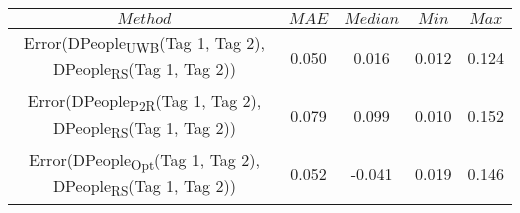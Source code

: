 \begin{table}[h]
\centering
{\small
\begin{tabular}{|c|c|c|c|c|}
\hline
$Method$ & $MAE$ & $Median$ & $Min$ & $Max$ \\
\hline
{\scriptsize Error(DPeople\textsubscript{UWB}(Tag 1, Tag 2), DPeople\textsubscript{RS}(Tag 1, Tag 2))} & 0.050 & 0.016 & 0.012 & 0.124 \\
\hline
{\scriptsize Error(DPeople\textsubscript{P2R}(Tag 1, Tag 2), DPeople\textsubscript{RS}(Tag 1, Tag 2))} & 0.079 & 0.099 & 0.010 & 0.152 \\
\hline
{\scriptsize Error(DPeople\textsubscript{Opt}(Tag 1, Tag 2), DPeople\textsubscript{RS}(Tag 1, Tag 2))} & 0.052 & -0.041 & 0.019 & 0.146 \\
\hline
\end{tabular}
}
\end{table}
